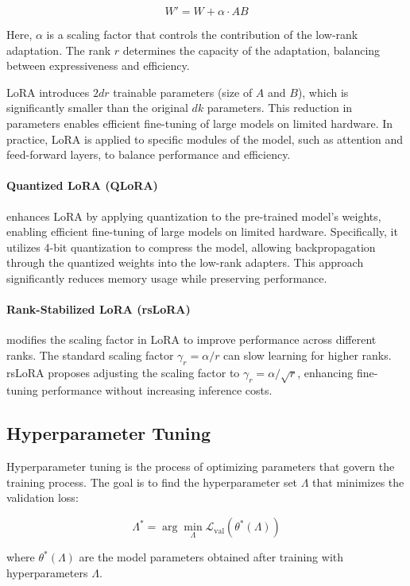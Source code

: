 \documentclass{article}
\newcounter{para}
\begin{document}
\[
W' = W + \alpha \cdot A B
\]

Here, \( \alpha \) is a scaling factor that controls the contribution of the low-rank adaptation. The rank \( r \) determines the capacity of the adaptation, balancing between expressiveness and efficiency.

LoRA introduces \( 2dr \) trainable parameters (size of \( A \) and \( B \)), which is significantly smaller than the original \( dk \) parameters. This reduction in parameters enables efficient fine-tuning of large models on limited hardware. In practice, LoRA is applied to specific modules of the model, such as attention and feed-forward layers, to balance performance and efficiency.

\paragraph{Quantized LoRA (QLoRA)} enhances LoRA by applying quantization to the pre-trained model's weights, enabling efficient fine-tuning of large models on limited hardware. Specifically, it utilizes 4-bit quantization to compress the model, allowing backpropagation through the quantized weights into the low-rank adapters. This approach significantly reduces memory usage while preserving performance.

\paragraph{Rank-Stabilized LoRA (rsLoRA)} modifies the scaling factor in LoRA to improve performance across different ranks. The standard scaling factor \( \gamma_r = \alpha / r \) can slow learning for higher ranks. rsLoRA proposes adjusting the scaling factor to \( \gamma_r = \alpha / \sqrt{r} \), enhancing fine-tuning performance without increasing inference costs.

\subsection{Hyperparameter Tuning} \label{sec:pre-hyperparam-tuning}

Hyperparameter tuning is the process of optimizing parameters that govern the training process. The goal is to find the hyperparameter set \( \Lambda \) that minimizes the validation loss:

\[
\Lambda^* = \arg\min_{\Lambda} \mathcal{L}_{\text{val}}(\theta^*(\Lambda))
\]

where \( \theta^*(\Lambda) \) are the model parameters obtained after training with hyperparameters \( \Lambda \).
\end{document}
